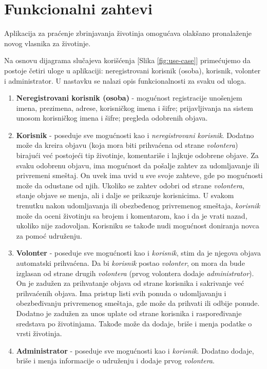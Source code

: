\documentclass[a4paper]{article}
\begin{document}
    
    

    \section{Funkcionalni zahtevi}
    \par Aplikacija za praćenje zbrinjavanja životinja omogućava olakšano pronalaženje novog vlasnika za životinje. 
    \par Na osnovu dijagrama slučajeva korišćenja [Slika \ref{fig:use-case}] primećujemo da postoje četiri uloge u aplikaciji: neregistrovani korisnik (osoba), korisnik, volonter i administrator. 
    U nastavku se nalazi opis funkcionalnosti za svaku od uloga.
    \begin{enumerate}
        \item \textbf{Neregistrovani korisnik (osoba)} - mogućnost registracije unošenjem imena, prezimena, adrese, korisničkog imena i šifre;
        prijavljivanja na sistem unosom korisničkog imena i šifre; pregleda odobrenih objava.
        \item \textbf{Korisnik} - poseduje sve mogućnosti kao i \textit{neregistrovani korisnik}. Dodatno može da kreira objavu (koja mora biti prihvaćena od strane
        \textit{volontera}) birajući već postojeći tip životinje, komentariše i lajkuje odobrene objave. Za svaku odobrenu objavu, ima mogućnost da pošalje zahtev za udomljavanje ili 
        privremeni smeštaj. On uvek ima uvid u sve svoje zahteve, gde po mogućnosti može da odustane od njih. Ukoliko se zahtev odobri od strane \textit{volontera}, stanje objave se menja, 
        ali i dalje se prikazuje korisnicima. U svakom trenutku nakon udomljavanja ili obezbeđenog privremenog smeštaja, \textit{korisnik} može da oceni životinju sa brojem i komentarom, 
        kao i da je vrati nazad, ukoliko nije zadovoljan. Korisniku se takođe nudi mogućnost doniranja novca za pomoć udruženju.
        \item \textbf{Volonter} - poseduje sve mogućnosti kao i \textit{korisnik}, stim da je njegova objava automatski prihvaćena. Da bi \textit{korisnik} postao \textit{volonter}, on mora
        da bude izglasan od strane drugih \textit{volontera} (prvog volontera dodaje \textit{administrator}). On je zadužen za prihvatanje objava od strane korisnika i sakrivanje već 
        prihvaćenih objava. Ima pristup listi svih ponuda o udomljavanju i obezbeđivanju privremenog smeštaja, gde može da prihvati ili odbije ponude. Dodatno je zadužen za unos uplate od 
        strane korisnika i raspoređivanje sredstava po životinjama. Takođe može da dodaje, briše i menja podatke o vrsti životinja. 
        \item \textbf{Administrator} - poseduje sve mogućnosti kao i \textit{korisnik}. Dodatno dodaje, briše i menja informacije o udruženju i dodaje prvog \textit{volontera}.
    \end{enumerate} 
\end{document}
